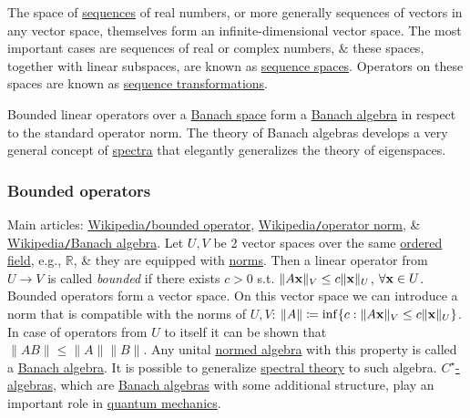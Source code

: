 \documentclass{article}
\begin{document}
The space of \href{https://en.wikipedia.org/wiki/Sequence}{sequences} of real numbers, or more generally sequences of vectors in any vector space, themselves form an infinite-dimensional vector space. The most important cases are sequences of real or complex numbers, \& these spaces, together with linear subspaces, are known as \href{https://en.wikipedia.org/wiki/Sequence_space}{sequence spaces}. Operators on these spaces are known as \href{https://en.wikipedia.org/wiki/Sequence_transformation}{sequence transformations}.

Bounded linear operators over a \href{https://en.wikipedia.org/wiki/Banach_space}{Banach space} form a \href{https://en.wikipedia.org/wiki/Banach_algebra}{Banach algebra} in respect to the standard operator norm. The theory of Banach algebras develops a very general concept of \href{https://en.wikipedia.org/wiki/Spectrum_(functional_analysis)}{spectra} that elegantly generalizes the theory of eigenspaces.

\subsubsection{Bounded operators}
Main articles: \href{https://en.wikipedia.org/wiki/Bounded_operator}{Wikipedia{\tt/}bounded operator}, \href{https://en.wikipedia.org/wiki/Operator_norm}{Wikipedia{\tt/}operator norm}, \& \href{https://en.wikipedia.org/wiki/Banach_algebra}{Wikipedia{\tt/}Banach algebra}. Let $U,V$ be 2 vector spaces over the same \href{https://en.wikipedia.org/wiki/Ordered_field}{ordered field}, e.g., $\mathbb{R}$, \& they are equipped with \href{https://en.wikipedia.org/wiki/Norm_(mathematics)}{norms}. Then a linear operator from $U\to V$ is called {\it bounded} if there exists $c > 0$ s.t. $\|A{\bf x}\|_V\le c\|{\bf x}\|_U$, $\forall{\bf x}\in U$. Bounded operators form a vector space. On this vector space we can introduce a norm that is compatible with the norms of $U,V$: $\|A\|\coloneqq\inf\{c:\|A{\bf x}\|_V\le c\|{\bf x}\|_U\}$. In case of operators from $U$ to itself it can be shown that $\|AB\|\le \|A\|\|B\|$. Any unital \href{https://en.wikipedia.org/wiki/Normed_algebra}{normed algebra} with this property is called a \href{https://en.wikipedia.org/wiki/Banach_algebra}{Banach algebra}. It is possible to generalize \href{https://en.wikipedia.org/wiki/Spectral_theory}{spectral theory} to such algebra. \href{https://en.wikipedia.org/wiki/C*-algebra}{$C^\star$-algebras}, which are \href{https://en.wikipedia.org/wiki/Banach_algebras}{Banach algebras} with some additional structure, play an important role in \href{https://en.wikipedia.org/wiki/Quantum_mechanics}{quantum mechanics}.
\end{document}

